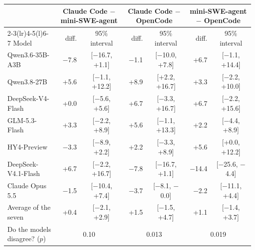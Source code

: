 \footnotesize\setlength{\tabcolsep}{4pt}
\begin{tabular}{@{}l rc rc rc@{}}
\toprule
 & \multicolumn{2}{c}{Claude Code $-$ mini-SWE-agent} & \multicolumn{2}{c}{Claude Code $-$ OpenCode} & \multicolumn{2}{c}{mini-SWE-agent $-$ OpenCode} \\
\cmidrule(lr){2-3}\cmidrule(lr){4-5}\cmidrule(l){6-7}
Model & diff. & 95\% interval & diff. & 95\% interval & diff. & 95\% interval \\
\midrule
Qwen3.6-35B-A3B & $-$7.8 & [$-$16.7, +1.1] & $-$1.1 & [$-$10.0, +7.8] & +6.7 & [$-$1.1, +14.4] \\
Qwen3.8-27B & +5.6 & [$-$1.1, +12.2] & +8.9 & [+2.2, +16.7] & +3.3 & [$-$2.2, +10.0] \\
DeepSeek-V4-Flash & +0.0 & [$-$5.6, +5.6] & +6.7 & [$-$3.3, +16.7] & +6.7 & [$-$2.2, +15.6] \\
GLM-5.3-Flash & +3.3 & [$-$2.2, +8.9] & +5.6 & [$-$1.1, +13.3] & +2.2 & [$-$4.4, +8.9] \\
HY4-Preview & $-$3.3 & [$-$8.9, +2.2] & +2.2 & [$-$3.3, +8.9] & +5.6 & [+0.0, +12.2] \\
DeepSeek-V4.1-Flash & +6.7 & [$-$2.2, +16.7] & $-$7.8 & [$-$16.7, +1.1] & $-$14.4 & [$-$25.6, $-$4.4] \\
Claude Opus 5.5 & $-$1.5 & [$-$10.4, +7.4] & $-$3.7 & [$-$8.1, $-$0.0] & $-$2.2 & [$-$11.1, +4.4] \\
\midrule
Average of the seven & +0.4 & [$-$2.1, +2.9] & +1.5 & [$-$1.5, +4.7] & +1.1 & [$-$1.4, +3.7] \\
Do the models disagree? ($p$) & \multicolumn{2}{c}{0.10} & \multicolumn{2}{c}{0.013} & \multicolumn{2}{c}{0.019} \\
\bottomrule
\end{tabular}
